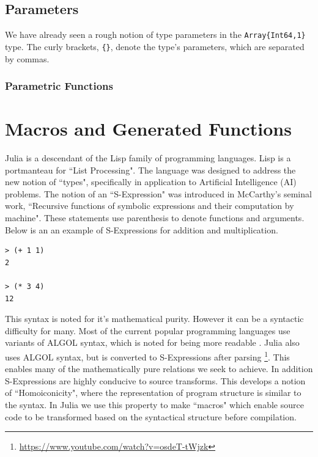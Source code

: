 \subsection{Parameters}



We have already seen a rough notion of type parameters in the
\texttt{Array\{Int64,1\}}
type. The curly brackets, \texttt{\{\}}, denote the type's parameters, which
are separated by commas. 

\subsubsection{Parametric Functions}


\section{Macros and Generated Functions}
Julia is a descendant of the Lisp family of programming languages. Lisp
is a portmanteau for ``List Processing". The language was designed to address
the new notion of ``types", specifically in application to Artificial
Intelligence (AI) problems\cite{McCarthy_1966}. The notion of an ``S-Expression"
was introduced in McCarthy's seminal work, ``Recursive functions of symbolic expressions and their
computation by machine". These statements use parenthesis
to denote functions and arguments. Below is an an example of S-Expressions
for addition and multiplication.

\begin{lstlisting}
> (+ 1 1)
2

> (* 3 4)
12
\end{lstlisting}

This syntax is noted for it's mathematical purity.
However it can be a syntactic difficulty for many.
Most of the current popular programming languages
use variants of ALGOL syntax, which is noted for being more readable
\cite{Hoare}.
Julia also uses ALGOL syntax, but is converted to S-Expressions after parsing
\footnote{\url{https://www.youtube.com/watch?v=osdeT-tWjzk}}.
This enables
many of the mathematically pure relations we seek to achieve.
In addition S-Expressions are highly conducive to source transforms.
This develops a notion of ``Homoiconicity", where the representation of
program structure is similar to the syntax. In Julia we use this property
to make ``macros" which enable source code to be transformed based on
the syntactical structure before compilation.


